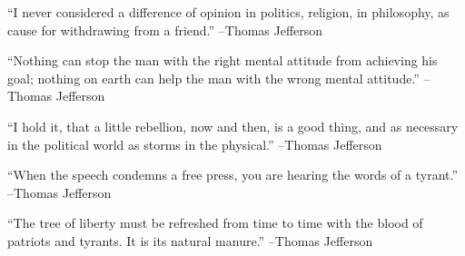 \documentclass{article}%
\begin{document}
\linebreak%
\vspace{1mm}%
\begin{minipage}{\textwidth}%
\flushleft%
“I never considered a difference of opinion in politics, religion, in philosophy, as cause for withdrawing from a friend.”%
\linebreak%
\vspace{1mm}%
–Thomas Jefferson%
\linebreak%
\vspace{1mm}%
\end{minipage}%
\linebreak%
\vspace{1mm}%
\begin{minipage}{\textwidth}%
\flushleft%
“Nothing can stop the man with the right mental attitude from achieving his goal; nothing on earth can help the man with the wrong mental attitude.”%
\linebreak%
\vspace{1mm}%
–Thomas Jefferson%
\linebreak%
\vspace{1mm}%
\end{minipage}%
\linebreak%
\vspace{1mm}%
\begin{minipage}{\textwidth}%
\flushleft%
“I hold it, that a little rebellion, now and then, is a good thing, and as necessary in the political world as storms in the physical.”%
\linebreak%
\vspace{1mm}%
–Thomas Jefferson%
\linebreak%
\vspace{1mm}%
\end{minipage}%
\linebreak%
\vspace{1mm}%
\begin{minipage}{\textwidth}%
\flushleft%
“When the speech condemns a free press, you are hearing the words of a tyrant.”%
\linebreak%
\vspace{1mm}%
–Thomas Jefferson%
\linebreak%
\vspace{1mm}%
\end{minipage}%
\linebreak%
\vspace{1mm}%
\begin{minipage}{\textwidth}%
\flushleft%
“The tree of liberty must be refreshed from time to time with the blood of patriots and tyrants. It is its natural manure.”%
\linebreak%
\vspace{1mm}%
–Thomas Jefferson%
\linebreak%
\vspace{1mm}%
\end{minipage}%
\end{document}
